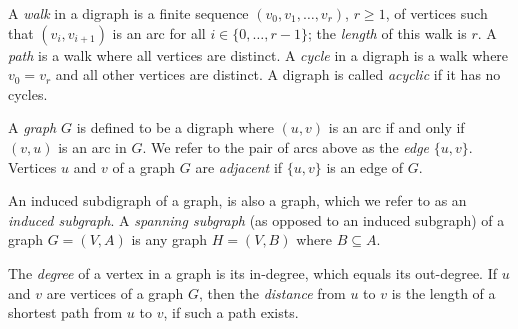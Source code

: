 A \emph{walk} in a digraph is a finite sequence $(v_0, v_1, \ldots,
v_r)$, $r\geq 1$, of vertices such that $(v_i, v_{i + 1})$ is an arc for all
$i\in \{0, \ldots, r - 1\}$; the \emph{length} of this walk is $r$. A
\emph{path} is a walk where all vertices are distinct. A \emph{cycle} in a
digraph is a walk where $v_0 = v_r$ and all other vertices are distinct.
A digraph is called \emph{acyclic} if it has no cycles.

A \emph{graph} $G$ is defined to be a digraph where $(u, v)$ is an arc if and
only if $(v, u)$ is an arc in $G$. We refer to the pair of arcs above as the
\emph{edge} $\{u, v\}$. Vertices $u$ and $v$ of a graph $G$ are
\emph{adjacent} if $\{u, v\}$ is an edge of $G$. 

An induced subdigraph of a graph, is also a graph, which we refer to as an
\emph{induced subgraph}. A \emph{spanning subgraph} (as opposed to an
induced subgraph) of a graph $G = (V, A)$ is any graph $H = (V, B)$ where $B
\subseteq A$. 

The \emph{degree} of a vertex in a graph is its in-degree, which equals
its out-degree. If $u$ and $v$ are vertices of a graph $G$, then the
\emph{distance} from $u$ to $v$ is the length of a shortest path from $u$ to
$v$, if such a path exists.
